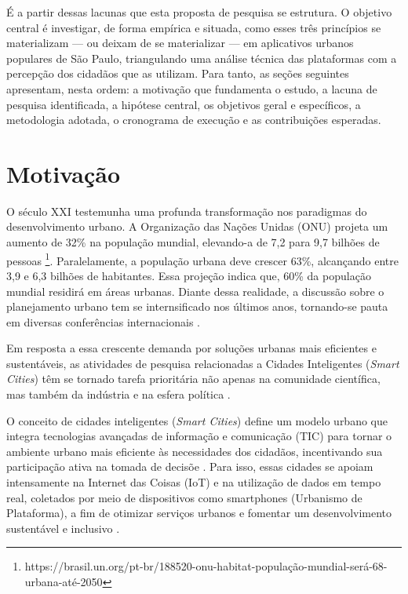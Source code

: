 \documentclass[
	12pt,				%
	oneside,			%
	a4paper,			%
	english,			%
	brazil				%
	]{abntex2ppgsi}
\begin{document}
    É a partir dessas lacunas que esta proposta de pesquisa se estrutura. O objetivo central é investigar, de forma empírica e situada, como esses três princípios se materializam — ou deixam de se materializar — em aplicativos urbanos populares de São Paulo, triangulando uma análise técnica das plataformas com a percepção dos cidadãos que as utilizam. Para tanto, as seções seguintes apresentam, nesta ordem: a motivação que fundamenta o estudo, a lacuna de pesquisa identificada, a hipótese central, os objetivos geral e específicos, a metodologia adotada, o cronograma de execução e as contribuições esperadas.

    
    
    \section{Motivação}

   O século XXI testemunha uma profunda transformação nos paradigmas do desenvolvimento urbano. A Organização das Nações Unidas (ONU) projeta um aumento de 32\% na população mundial, elevando-a de 7,2 para 9,7 bilhões de pessoas \footnote{https://brasil.un.org/pt-br/188520-onu-habitat-população-mundial-será-68-urbana-até-2050}. Paralelamente, a população urbana deve crescer 63\%, alcançando entre 3,9 e 6,3 bilhões de habitantes. Essa projeção indica que, 60\% da população mundial residirá em áreas urbanas. Diante dessa realidade, a discussão sobre o planejamento urbano tem se internsificado nos últimos anos, tornando-se pauta em diversas conferências internacionais \cite{EREMIA201712}.

   Em resposta a essa crescente demanda por soluções urbanas mais eficientes e sustentáveis, as atividades de pesquisa relacionadas a Cidades Inteligentes (\textit{Smart Cities})  têm se tornado tarefa prioritária não apenas na comunidade científica, mas também da indústria e na esfera política \cite{EREMIA201712}.

   O conceito de cidades inteligentes (\textit{Smart Cities}) define um modelo urbano que integra tecnologias avançadas de informação e comunicação (TIC) para tornar o ambiente urbano mais eficiente às necessidades dos cidadãos, incentivando sua participação ativa na tomada de decisõe \cite{EREMIA201712}. Para isso, essas cidades se apoiam intensamente na Internet das Coisas (IoT) e na utilização de dados em tempo real, coletados por meio de dispositivos como smartphones (Urbanismo de Plataforma), a fim de otimizar serviços urbanos e fomentar um desenvolvimento sustentável e inclusivo \cite{Chakrabarty}.
\end{document}
